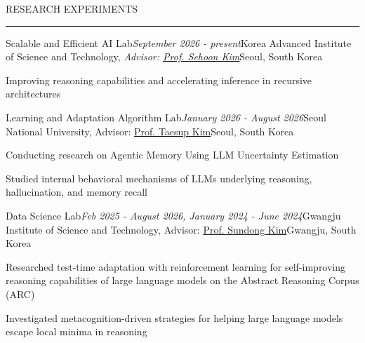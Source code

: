 \documentclass{resume} %
\renewenvironment{rSection}[1]{
\vspace{-0.5 em} %
\sectionskip
\textcolor{RoyalPurple}{\MakeUppercase{#1}}
\sectionlineskip
\hrule
\begin{list}{}{
\setlength{\leftmargin}{1.5em}
}
\item[]
}{
\end{list}
}
\begin{document}
\vspace{+0.5 em} %
\begin{rSection}{Research Experiments}


\begin{rSubsection}{Scalable and Efficient AI Lab}{\em September 2026 - present}{Korea Advanced Institute of Science and Technology, \emph{Advisor: \href{https://sehoonkim.org/}{Prof. Sehoon Kim}}}{Seoul, South Korea}
\vspace{-0.3 em}
\item Improving reasoning capabilities and accelerating inference in recursive architectures

\end{rSubsection}

\vspace{-0.75 em}

\begin{rSubsection}{Learning and Adaptation Algorithm Lab}{\em January 2026 - August 2026}{Seoul National University, Advisor: \href{https://www.snu-laal.com/}{Prof. Taesup Kim}}{Seoul, South Korea}
\vspace{-0.3 em}
\item Conducting research on Agentic Memory Using LLM Uncertainty Estimation
\item Studied internal behavioral mechanisms of LLMs underlying reasoning, hallucination, and memory recall

\end{rSubsection}

\vspace{-0.75 em}

\begin{rSubsection}{Data Science Lab}{\em Feb 2025 - August 2026, January 2024 - June 2024}{Gwangju Institute of Science and Technology, Advisor: \href{https://sundong.kim/}{Prof. Sundong Kim}}{Gwangju, South Korea}
\vspace{-0.3 em}
\item Researched test-time adaptation with reinforcement learning for self-improving reasoning capabilities of large language models on the Abstract Reasoning Corpus (ARC)
\item Investigated metacognition-driven strategies for helping large language models escape local minima in reasoning


\end{rSubsection}
\end{rSection}
\end{document}
